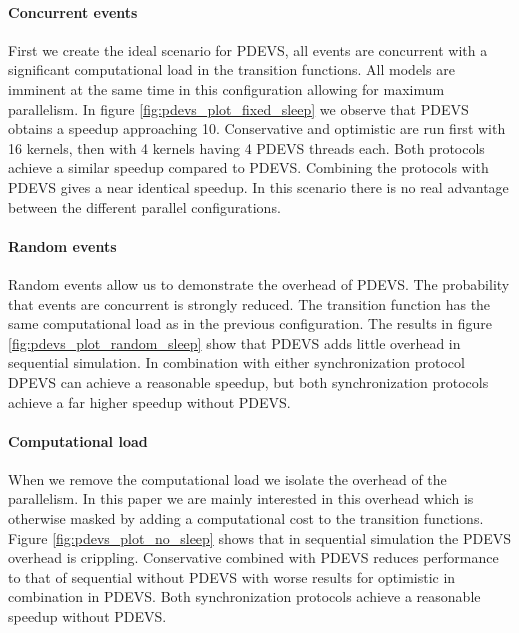 \paragraph{Concurrent events}
First we create the ideal scenario for PDEVS, all events are concurrent with a significant computational load in the transition functions. All models are imminent at the same time in this configuration allowing for maximum parallelism.
In figure \ref{fig:pdevs_plot_fixed_sleep} we observe that PDEVS obtains a speedup approaching 10.  
Conservative and optimistic are run first with 16 kernels, then with 4 kernels having 4  PDEVS threads each. 
Both protocols achieve a similar speedup compared to PDEVS. Combining the protocols with PDEVS gives a near identical speedup.
In this scenario there is no real advantage between the different parallel configurations.


\paragraph{Random events}
Random events allow us to demonstrate the overhead of PDEVS. The probability that events are concurrent is strongly reduced.
The transition function has the same computational load as in the previous configuration. 
The results in figure \ref{fig:pdevs_plot_random_sleep} show that PDEVS adds little overhead in sequential simulation. 
In combination with either synchronization protocol DPEVS can achieve a reasonable speedup, but both synchronization protocols achieve a far higher speedup without PDEVS.

\paragraph{Computational load}
When we remove the computational load we isolate the overhead of the parallelism. 
In this paper we are mainly interested in this overhead which is otherwise masked by adding a computational cost to the transition functions. 
Figure \ref{fig:pdevs_plot_no_sleep} shows that in sequential simulation the PDEVS overhead is crippling. Conservative combined with PDEVS reduces performance to that of sequential without PDEVS with worse results for optimistic in combination in PDEVS.
Both synchronization protocols achieve a reasonable speedup without PDEVS.  
 
